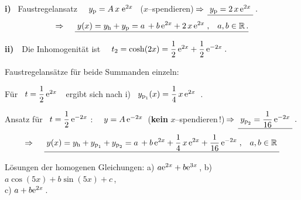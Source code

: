 {\begin{enumerate}
\textbf{i)} \ Faustregelansatz \ \ $y_{\text{p}}=A\,x\;\mathrm{e}^{2x}$ \ (\glqq$x$--spendieren\grqq)$ \,\Rightarrow\,  \underline{\;y_{\text{p}} = 2\,x\,\mathrm{e}^{2x}\;}\;.$%
\[
\Rightarrow \;\;\;\;\underline{\;y(x)=y_{\text{h}}+y_{\text{p}} = 
a\,+b\,\mathrm{e}^{2x}+2\,x\,\mathrm{e}^{2x}\;,\;\;\;a,b\in \mathbb{R}\,.}
\]

\textbf{ii)}\ \ Die Inhomogenit\"at ist \ \ $t_{2}= \cosh(2x)=\dfrac{1}{2}\,\mathrm{e}^{2x}+\dfrac{1}{2}\,\mathrm{e}^{-2x}\;.$

Faustregelans\"atze f\"ur beide Summanden einzeln:

F\"ur \ $t=\dfrac{1}{2}\,\mathrm{e}^{2x}$\ \ ergibt sich nach i) \ \underline{\;$y_{\text{p}_{1}}(x)=\dfrac{1}{4}\,x\,\mathrm{e}^{2x}\;$}$\;.$

Ansatz f\"ur \ $t=\dfrac{1}{2}\,\mathrm{e}^{-2x}$ : \ \ $y=A\,\mathrm{e}^{-2x}\;\;$(\textbf{kein} \glqq$x$--spendieren\grqq\,!)$ \,\Rightarrow\,  \underline{\;y_{\text{p}_{2}}=\dfrac{1}{16}\,\mathrm{e}^{-2x}\;}\;.$%
\[
\Rightarrow \;\;\;\;\underline{\;y(x) = y_{\text{h}}+y_{\text{p}_{1}}+y_{\text{p}_{2}} = a\,+b\,\mathrm{e}^{2x}+\dfrac{1}{4}\,x\,\mathrm{e}^{2x}+\dfrac{1}{16}\,\mathrm{e}^{-2x}\;,\;\;\;a,b\in \mathbb{R}\;}
\]


\end{enumerate}
}


{
L\"osungen der homogenen Gleichungen: 
a) $a\mathrm{e}^{2x}+b\mathrm{e}^{3x}$\,,  
b) $a\cos(5x)+b\sin(5x)+c$\,,\\ 
c) $a+b\mathrm{e}^{2x}$\,.
}
